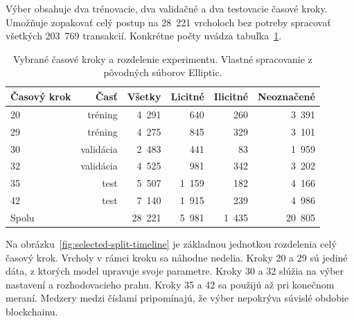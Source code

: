 Výber obsahuje dva trénovacie, dva validačné a dva testovacie časové
kroky. Umožňuje zopakovať celý postup na 28~221 vrcholoch bez potreby
spracovať všetkých 203~769 transakcií. Konkrétne počty uvádza
tabuľka~\ref{tab:selected-steps}.

\begin{table}[htbp]
  \centering
  \caption{Vybrané časové kroky a rozdelenie experimentu. Vlastné
  spracovanie z pôvodných súborov Elliptic.}
  \label{tab:selected-steps}
  \begin{tabular}{lrrrrr}
    \toprule
    Časový krok & Časť & Všetky & Licitné & Ilicitné & Neoznačené \\
    \midrule
    20 & tréning & 4~291 & 640 & 260 & 3~391 \\
    29 & tréning & 4~275 & 845 & 329 & 3~101 \\
    30 & validácia & 2~483 & 441 & 83 & 1~959 \\
    32 & validácia & 4~525 & 981 & 342 & 3~202 \\
    35 & test & 5~507 & 1~159 & 182 & 4~166 \\
    42 & test & 7~140 & 1~915 & 239 & 4~986 \\
    \midrule
    Spolu & & 28~221 & 5~981 & 1~435 & 20~805 \\
    \bottomrule
  \end{tabular}
\end{table}

Na obrázku~\ref{fig:selected-split-timeline} je základnou jednotkou
rozdelenia celý časový krok. Vrcholy v rámci kroku sa náhodne nedelia.
Kroky 20 a 29 sú
jediné dáta, z ktorých model upravuje svoje parametre. Kroky 30 a 32
slúžia na výber nastavení a rozhodovacieho prahu. Kroky 35 a 42 sa
použijú až pri konečnom meraní. Medzery medzi číslami pripomínajú, že
výber nepokrýva súvislé obdobie blockchainu.

